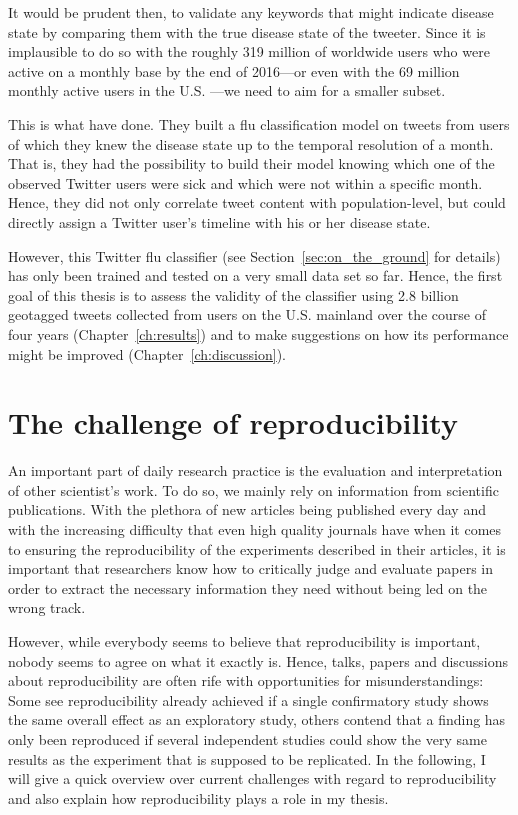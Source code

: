 \documentclass[11pt, a4paper,twoside]{report}\usepackage[]{graphicx}\usepackage[]{color}
\begin{document}
It would be prudent then, to validate any keywords that might indicate disease state by comparing them with the true disease state of the tweeter. Since it is implausible to do so with the roughly 319 million of worldwide users who were active on a monthly base by the end of 2016---or even with the 69 million monthly active users in the U.S. \citep{twitter_annual_2017}---we need to aim for a smaller subset.

This is what \cite{bodnar_ground_2014} have done. They built a flu classification model on tweets from users of which they knew the disease state up to the temporal resolution of a month. That is, they had the possibility to build their model knowing which one of the observed Twitter users were sick and which were not within a specific month. Hence, they did not only correlate tweet content with population-level, but could directly assign a Twitter user's timeline with his or her disease state. 

However, this Twitter flu classifier (see Section~\ref{sec:on_the_ground} for details) has only been trained and tested on a very small data set so far. Hence, the first goal of this thesis is to assess the validity of the classifier using 2.8 billion geotagged tweets collected from users on the U.S. mainland over the course of four years (Chapter~\ref{ch:results}) and to make suggestions on how its performance might be improved (Chapter~\ref{ch:discussion}).
\cleardoublepage

\chapter{The challenge of reproducibility}
\label{ch:reproducibility}
An important part of daily research practice is the evaluation and interpretation of other scientist's work. To do so, we mainly rely on information from scientific publications. With the plethora of new articles being published every day and with the increasing difficulty that even high quality journals have when it comes to ensuring the reproducibility of the experiments described in their articles, it is important that researchers know how to critically judge and evaluate papers in order to extract the necessary information they need without being led on the wrong track. 

However, while everybody seems to believe that reproducibility is important, nobody seems to agree on what it exactly is. Hence, talks, papers and discussions about reproducibility are often rife with opportunities for misunderstandings: Some see reproducibility already achieved if a single confirmatory study shows the same overall effect as an exploratory study, others contend that a finding has only been reproduced if several independent studies could show the very same results as the experiment that is supposed to be replicated. In the following, I will give a quick overview over current challenges with regard to reproducibility and also explain how reproducibility plays a role in my thesis. 
\end{document}
